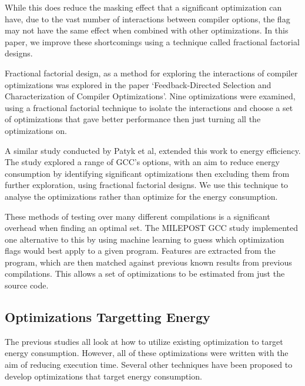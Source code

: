 \documentclass[twocolumn]{article}
\begin{document}
While this does reduce the masking effect that a significant optimization can have, due to the vast number of interactions between compiler options, the flag may not have the same effect when combined with other optimizations. In this paper, we improve these shortcomings using a technique called fractional factorial designs.

Fractional factorial design, as a method for exploring the interactions of compiler optimizations was explored in the paper `Feedback-Directed Selection and Characterization of Compiler Optimizations'\cite{IntelPaper}. Nine optimizations were examined, using a fractional factorial technique to isolate the interactions and choose a set of optimizations that gave better performance then just turning all the optimizations on.

A similar study conducted by Patyk et al\cite{EnergyReductionCompilerOptions}, extended this work to energy efficiency. The study explored a range of GCC's options, with an aim to reduce energy consumption by identifying significant optimizations then excluding them from further exploration, using fractional factorial designs. We use this technique to analyse the optimizations rather than optimize for the energy consumption.

These methods of testing over many different compilations is a significant overhead when finding an optimal set. The MILEPOST GCC\cite{Fursin2011} study implemented one alternative to this by using machine learning to guess which optimization flags would best apply to a given program. Features are extracted from the program, which are then matched against previous known results from previous compilations. This allows a set of optimizations to be estimated from just the source code.

\subsection{Optimizations Targetting Energy}

The previous studies all look at how to utilize existing optimization to target energy consumption. However, all of these optimizations were written with the aim of reducing execution time. Several other techniques have been proposed to develop optimizations that target energy consumption.
\end{document}
